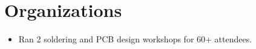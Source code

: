 \section{Organizations}
\begin{itemize}
  \item Ran 2 soldering and PCB design workshops for 60+ attendees.
\end{itemize}
